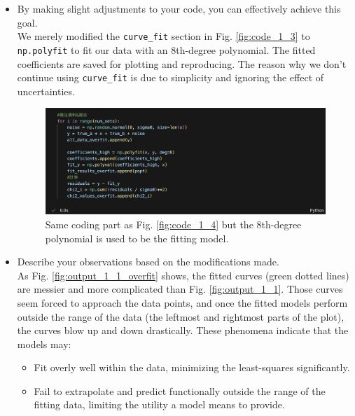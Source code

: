 \documentclass[12pt,a4paper]{article}
\begin{document}
\begin{CJK}{UTF8}{bkai}
\begin{itemize}
    \item By making slight adjustments to your code, you can effectively achieve this goal.\\
    We merely modified the \texttt{curve\_fit} section in Fig. \ref{fig:code_1_3} to \texttt{np.polyfit} to fit our data with an 8th-degree polynomial. The fitted coefficients are saved for plotting and reproducing. The reason why we don't continue using \texttt{curve\_fit} is due to simplicity and ignoring the effect of uncertainties.
    \begin{figure}[h]
        \centering
        \includegraphics[width=1\linewidth]{figures/code/practice_1/code_1_6.png}
        \caption{Same coding part as Fig. \ref{fig:code_1_4} but the 8th-degree polynomial is used to be the fitting model.}
        \label{fig:code_1_6}
    \end{figure}

    

    \item Describe your observations based on the modifications made.\\
    As Fig. \ref{fig:output_1_1_overfit} shows, the fitted curves (green dotted lines) are messier and more complicated than Fig. \ref{fig:output_1_1}. Those curves seem forced to approach the data points, and once the fitted models perform outside the range of the data (the leftmost and rightmost parts of the plot), the curves blow up and down drastically. These phenomena indicate that the models may:
    \begin{itemize}
        \item Fit overly well within the data, minimizing the least-squares significantly.
        \item Fail to extrapolate and predict functionally outside the range of the fitting data, limiting the utility a model means to provide.
    \end{itemize}
    

\end{itemize}
\end{CJK}
\end{document}
